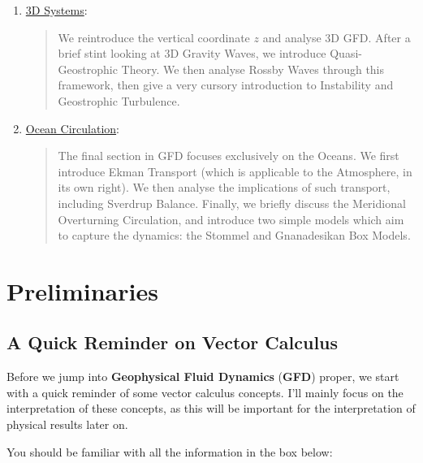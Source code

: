 \begin{enumerate}
    \item \hyperref[3D Systems]{3D Systems}:
        
        \begin{quote}
            We reintroduce the vertical coordinate $z$ and analyse 3D GFD. After a brief stint looking at 3D Gravity Waves, we introduce Quasi-Geostrophic Theory. We then analyse Rossby Waves through this framework, then give a very cursory introduction to Instability and Geostrophic Turbulence.
        \end{quote}

    \item \hyperref[Oceans]{Ocean Circulation}:
        
        \begin{quote}
            The final section in GFD focuses exclusively on the Oceans. We first introduce Ekman Transport (which is applicable to the Atmosphere, in its own right). We then analyse the implications of such transport, including Sverdrup Balance. Finally, we briefly discuss the Meridional Overturning Circulation, and introduce two simple models which aim to capture the dynamics: the Stommel and Gnanadesikan Box Models.
        \end{quote}
\end{enumerate}

\chapter{Preliminaries}\label{Prelim GFD}

\section{A Quick Reminder on Vector Calculus}

Before we jump into \textbf{Geophysical Fluid Dynamics} (\textbf{GFD}) proper, we start with a quick reminder of some vector calculus concepts. I'll mainly focus on the interpretation of these concepts, as this will be important for the interpretation of physical results later on.

You should be familiar with all the information in the box below:

